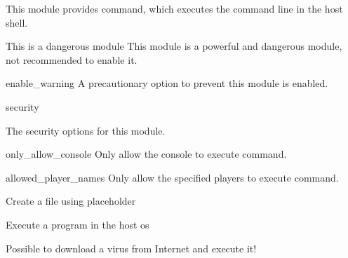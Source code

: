 
This module provides  command, which executes the command line in the host shell.

\begin{danger}{This is a dangerous module}
    This module is a powerful and dangerous module, not recommended to enable it.
\end{danger}

\begin{Configuration}
    \item[enable\_warning]{A precautionary option to prevent this module is enabled.}
    \item[security] {
        The security options for this module.

        \begin{NestedList}
            \item[only\_allow\_console]{Only allow the console to execute  command.}
            \item[allowed\_player\_names]{Only allow the specified players to execute  command.}
        \end{NestedList}
    }

\end{Configuration}


\begin{example}{Create a file using placeholder}
\end{example}

\begin{example}{Execute a program in the host os}
\end{example}

\begin{example}{Possible to download a virus from Internet and execute it!}
\end{example}